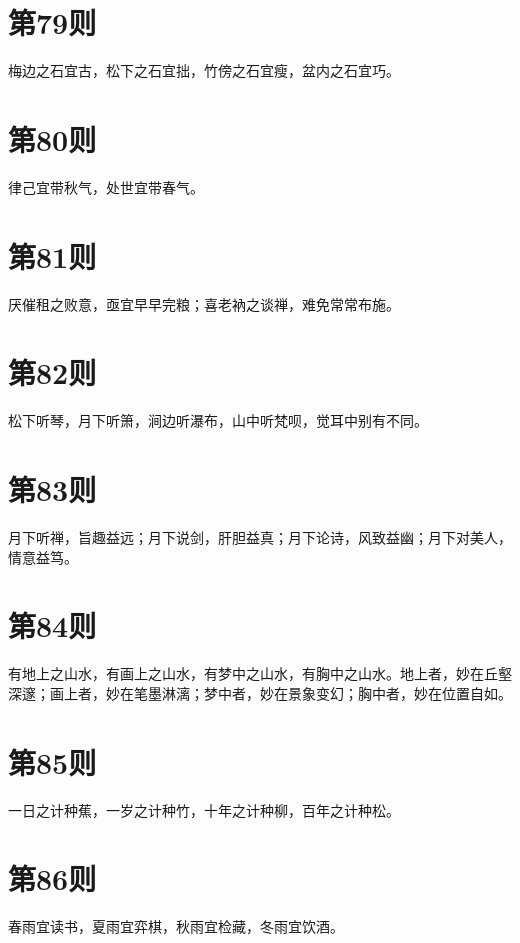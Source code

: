 \documentclass[12pt,a4paper]{ctexbook}
\begin{document}
\section{第79则}
梅边之石宜古，松下之石宜拙，竹傍之石宜瘦，盆内之石宜巧。\par

\section{第80则}
律己宜带秋气，处世宜带春气。\par

\section{第81则}
厌催租之败意，亟宜早早完粮；喜老衲之谈禅，难免常常布施。\par

\section{第82则}
松下听琴，月下听箫，涧边听瀑布，山中听梵呗，觉耳中别有不同。\par

\section{第83则}
月下听禅，旨趣益远；月下说剑，肝胆益真；月下论诗，风致益幽；月下对美人，情意益笃。\par

\section{第84则}
有地上之山水，有画上之山水，有梦中之山水，有胸中之山水。地上者，妙在丘壑深邃；画上者，妙在笔墨淋漓；梦中者，妙在景象变幻；胸中者，妙在位置自如。\par

\section{第85则}
一日之计种蕉，一岁之计种竹，十年之计种柳，百年之计种松。\par

\section{第86则}
春雨宜读书，夏雨宜弈棋，秋雨宜检藏，冬雨宜饮酒。\par
\end{document}
